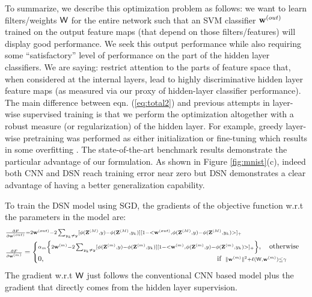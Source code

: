 \documentclass{article} %
\newcommand{\cW}{{\bf \mathsf{W}}}
\newcommand{\cZ}{{\bf Z}}
\newcommand{\sw}{{\bf w}}
\newcommand{\sL}{\ell}
\begin{document}
To summarize, we describe this optimization problem as follows: we want to learn filters/weights $\cW$ for the entire network such that an SVM classifier $\sw^{(out)}$ trained on the output feature maps (that depend on those filters/features) will display good performance. We seek this output performance while also requiring some ``satisfactory'' level of performance on the part of the hidden layer classifiers. We are saying: restrict attention to the parts of feature space that, when considered at the internal layers, lead to highly discriminative hidden layer feature maps (as measured via our proxy of hidden-layer classifier performance). The main difference between eqn. (\ref{eq:total2}) and previous attempts in layer-wise supervised training is that we perform the optimization altogether with a robust measure (or regularization) of the hidden layer. For example, greedy layer-wise pretraining was performed as either initialization or fine-tuning which results in some overfitting \cite{pretrain}. The state-of-the-art benchmark results demonstrate the particular advantage of our formulation. As shown in Figure \ref{fig:mnist}(c), indeed both CNN and DSN reach training error near zero but DSN demonstrates a clear advantage of having a better generalization capability. 


To train the DSN model using SGD, the gradients of the objective function w.r.t the parameters in the model are:
\begin{equation} \label{eq:grad}
\begin{split}
& {\scriptstyle \frac{\partial F}{\partial \sw^{(out)}} = 2\sw^{(out)} - 2 \sum_{y_k \ne y} [\phi(\cZ^{(M)}, y) - \phi(\cZ^{(M)}, y_k)][1- <\sw^{(out)},  \phi(\cZ^{(M)}, y) - \phi(\cZ^{(M)}, y_k)>]_{+}} \\
& {\scriptstyle \frac{\partial F}{\partial \sw^{(m)}}} = \begin{cases} {\scriptstyle \alpha_m \left\{ 2\sw^{(m)} - 2 \sum_{y_k \ne y} [\phi(\cZ^{(m)}, y) - \phi(\cZ^{(m)}, y_k)][1- <\sw^{(m)},  \phi(\cZ^{(m)}, y) - \phi(\cZ^{(m)}, y_k)>]_{+} \right\} },
\quad \text{otherwise} \\
0, \qquad\qquad\qquad\qquad\qquad\qquad\qquad\qquad\qquad\qquad\qquad\qquad \text{if} \;\; {\scriptstyle \lVert \sw^{(m)} \rVert^2+\sL(\cW, \sw^{(m)}) \le \gamma}
\end{cases}
\end{split}
\end{equation}
The gradient w.r.t $\cW$ just follows the conventional CNN based model plus the gradient that directly comes from the hidden layer supervision.
\end{document}
